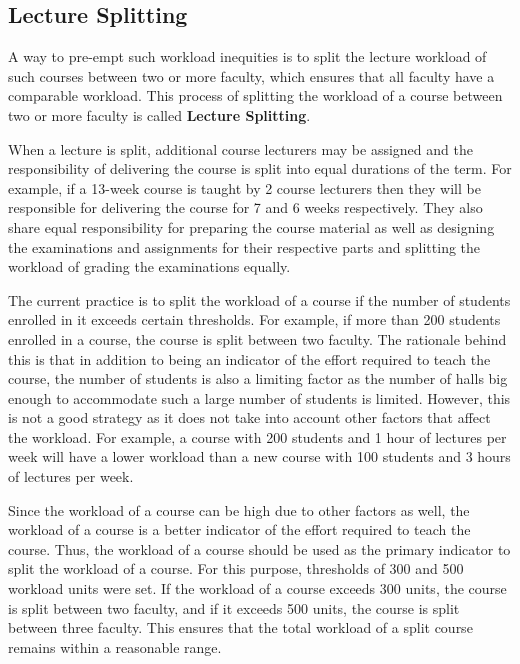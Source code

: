 \subsection{Lecture Splitting}
\label{sec:lecture_splitting}

A way to pre-empt such workload inequities is to split the lecture workload of such courses between two or more faculty, which ensures that all faculty have a comparable workload. This process of splitting the workload of a course between two or more faculty is called \textbf{Lecture Splitting}.

When a lecture is split, additional course lecturers may be assigned and the responsibility of delivering the course is split into equal durations of the term. For example, if a 13-week course is taught by
2 course lecturers then they will be responsible for delivering the course for 7 and 6 weeks respectively. They also share equal responsibility for preparing the course material as well as designing the examinations and assignments for their respective parts and splitting the workload of grading the examinations equally.

The current practice is to split the workload of a course if the number of students enrolled in it exceeds certain thresholds. For example, if more than 200 students enrolled in a course, the course is split between two faculty. The rationale behind this is that in addition to being an indicator of the effort required to teach the course, the number of students is also a limiting factor as the number of halls big enough to accommodate such a large number of students is limited. However, this is not a good strategy as it does not take into account other factors that affect the workload. For example, a course with 200 students and 1 hour of lectures per week will have a lower workload than a new course with 100 students and 3 hours of lectures per week.

Since the workload of a course can be high due to other factors as well, the workload of a course is a better indicator of the effort required to teach the course. Thus, the workload of a course should be used as the primary indicator to split the workload of a course. For this purpose, thresholds of 300 and 500 workload units were set. If the workload of a course exceeds 300 units, the course is split between two faculty, and if it exceeds 500 units, the course is split between three faculty. This ensures that the total workload of a split course remains within a reasonable range.

